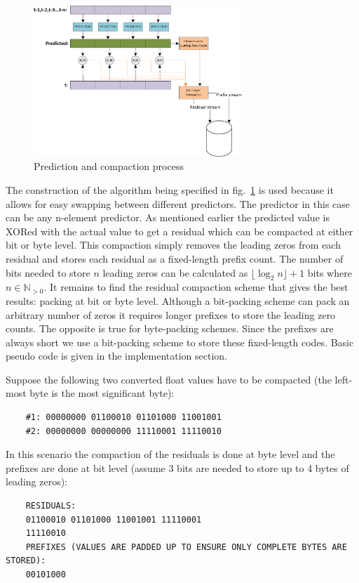 \begin{figure}[h!]
 \centering
 \includegraphics[width=0.7\textwidth]{Thesis_Alg.png}
 \caption{Prediction and compaction process}
 \label{PACKING_ALGORITHM}
\end{figure}

The construction of the algorithm being specified in fig.~\ref{PACKING_ALGORITHM} is used because it allows for easy swapping between different predictors. The predictor in this case 
can be any n-element predictor. As mentioned earlier the predicted value is XORed with the actual value to get a residual which can be compacted at either bit or byte level. This 
compaction simply removes the leading zeros from each residual and stores each residual as a fixed-length prefix count. The number of bits needed to store $n$ leading 
zeros can be calculated as $\lfloor\log_2n\rfloor+1$ bits where $n\in\mathbb{N}_{>0}$. It remains to find the residual compaction scheme that gives the best results: packing at 
bit or byte level. Although a bit-packing scheme can pack an arbitrary number of zeros it requires longer prefixes to store the leading zero counts. The opposite is true 
for byte-packing schemes. Since the prefixes are always short we use a bit-packing scheme to store these fixed-length codes. Basic pseudo code is given in the implementation section.

Suppose the following two converted float values have to be compacted (the left-most byte is the most significant byte):
\begin{center}
  \begin{verbatim}
    #1: 00000000 01100010 01101000 11001001
    #2: 00000000 00000000 11110001 11110010
  \end{verbatim}
\end{center}
In this scenario the compaction of the residuals is done at byte level and the prefixes are done at bit level (assume 3 bits are needed to store up to 4 bytes of leading zeros):
\begin{center}
  \begin{verbatim}
    RESIDUALS:
    01100010 01101000 11001001 11110001 
    11110010
    PREFIXES (VALUES ARE PADDED UP TO ENSURE ONLY COMPLETE BYTES ARE STORED):
    00101000
  \end{verbatim}
\end{center} 
